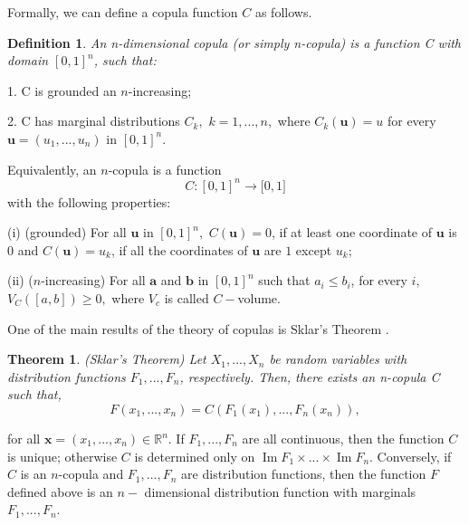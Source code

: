 \documentclass[a4paper,10pt]{article}
\DeclareMathOperator{\Ima}{Im}
\newtheorem{theorem}{Theorem}
\newtheorem{definition}{Definition}
\begin{document}
\bigskip

Formally, we can define a copula function $C$ as follows. \bigskip

\begin{definition}
	An n-dimensional copula (or simply n-copula) is a function C with domain $%
	[0,1]^{n}$, such that:
\end{definition}

1. C is grounded an $n$-increasing;

2. C has marginal distributions $C_{k},$ $k=1,...,n,$ where $C_{k}(\mathbf{u}%
)=u$ for every $\mathbf{u}=\left( u_{1},...,u_{n}\right) $ in $[0,1]^{n}.$

\bigskip

Equivalently, an $n$-copula is a function
\begin{equation*}
C:[0,1]^{n}\rightarrow \lbrack 0,1]
\end{equation*}%
with the following properties:

(i) (grounded) For all $\mathbf{u}$ in $[0,1]^{n},$ $C(\mathbf{u})=0$, if at
least one coordinate of $\mathbf{u}$ is $0$ and $C(\mathbf{u})=u_{k}$, if
all the coordinates of $\mathbf{u}$ are $1$ except $u_{k};$

(ii) ($n$-increasing) For all $\mathbf{a}$ and $\mathbf{b}$ in $[0,1]^{n}$
such that $a_{i}\leq b_{i}$, for every $i,$ $V_{C}\left( \left[ a,b\right]
\right) \geq 0,$ where $V_{c}$ is called $C-$volume.

One of the main results of the theory of copulas is Sklar's Theorem \citet*{%
	sklar1959}.

\bigskip

\begin{theorem}
	(Sklar's Theorem) Let $X_{1},...,X_{n}$ be random variables with
	distribution functions $F_{1},...,F_{n}$, respectively. Then, there exists
	an n-copula C such that,
	\begin{equation}
	F\left( x_{1},...,x_{n}\right) =C\left( F_{1}\left( x_{1}\right)
	,...,F_{n}\left( x_{n}\right) \right) ,  \label{21} 
	\end{equation}
\end{theorem} 
\noindent for all $\mathbf{x}=\left( x_{1},...,x_{n}\right) \in
\mathbb{R}
^{n}$. If $F_{1},...,F_{n}$ are all continuous, then the function $C$ is
unique; otherwise $C$ is determined only on $\Ima F_{1}\times ...\times \Ima %
F_{n}$. Conversely, if $C$ is an $n$-copula and $F_{1},...,F_{n}$ are
distribution functions, then the function $F$ defined above is an $n-$%
dimensional distribution function with marginals $F_{1},...,F_{n}$.
\end{document}
